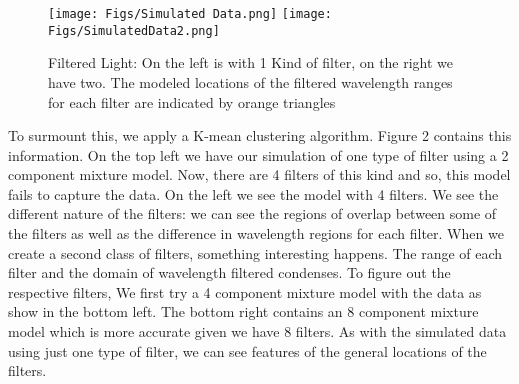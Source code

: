 \documentclass[11pt]{article}
\begin{document}
\begin{figure}[htb]
\begin{center}
\texttt{[image: Figs/Simulated Data.png]}
\texttt{[image: Figs/SimulatedData2.png]}
\caption{{\small Filtered Light: On the left is with 1 Kind of filter, on the right we have two. The modeled locations of the filtered wavelength ranges for each filter are indicated by orange triangles}}
\label{fig:somedata}
\end{center}  
\end{figure}

To surmount this, we apply a K-mean clustering algorithm. Figure 2 contains this information. On the top left we have our simulation of one type of filter using a 2 component mixture model. Now, there are 4 filters of this kind and so, this model fails to capture the data. On the left we see the model with 4 filters. We see the different nature of the filters: we can see the regions of overlap between some of the filters as well as the difference in wavelength regions for each filter. When we create a second class of filters, something interesting happens. The range of each filter and the domain of wavelength filtered condenses. To figure out the respective filters, We first try a 4 component mixture model with the data as show in the bottom left. The bottom right contains an 8 component mixture model which is more accurate given we have 8 filters. As with the simulated data using just one type of filter, we can see features of the general locations of the filters.
\end{document}
